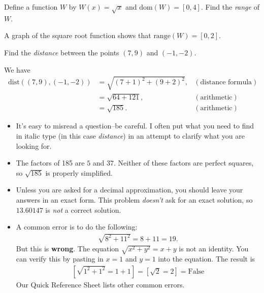 \documentclass[12pt,fleqn,answers]{exam}
\newcommand{\dom}{\mbox{dom}}
\newcommand{\range}{\mbox{range}}
\newcommand{\dist}{\, \mathrm{dist}}
\begin{document}
\begin{questions} 

    \question Define a function $W$ by $W(x) = \sqrt{x}$ and $\dom(W) = [0,4]$. 
    Find the \emph{range} of $W$.
    \begin{solution}
      A graph of the square root function shows that $\range(W) = [0,2].$
      \end{solution}
    \question [5] Find the \emph{distance} between the points $(7,9)$ and $(-1,-2)$.
    \begin{solution}[2.0in]
    We have
    \begin{align*}
        \dist((7,9),(-1,-2)) &= \sqrt{(7+1)^2 + (9 + 2)^2}, &(\mbox{distance formula})\\
                               &= \sqrt{64+ 121}, &(\mbox{arithmetic})\\
                               &= \sqrt{185}. &(\mbox{arithmetic})
    \end{align*}
    \begin{itemize}
    
        \item It's easy to misread a question--be careful. I often put what you need to find in italic type (in this case \emph{distance})  in an attempt to clarify what you are looking for.
        
        \item The factors of 185 are $5$ and $37$.  Neither of these factors are perfect squares, so $\sqrt{185}$
        is properly simplified. 
    
        \item Unless you are asked for a decimal approximation, you should leave
        your answers in an exact form. This problem \emph{doesn't} ask for an exact 
        solution, so  $13.60147$ is \emph{not} a correct solution.
        
        \item A common error is to do the following:
        \begin{align*}
            \sqrt{8^2 + 11^2} = 8 + 11  = 19.
       \end{align*}
        But this is \textbf{wrong}. The equation $\sqrt{x^2 + y^2} = x + y$ is not an identity. You can verify this by 
        pasting in $x = 1$ and $y=1$ into the equation. The result is
         \begin{align*}
            \left[\sqrt{1^2 + 1^2} = 1+ 1 \right]  = \left[\sqrt{2} = 2 \right] = \mbox{False}
       \end{align*}
       Our Quick Reference Sheet lists other common errors.
    \end{itemize}
    

\end{solution}
\end{questions}
\end{document}
